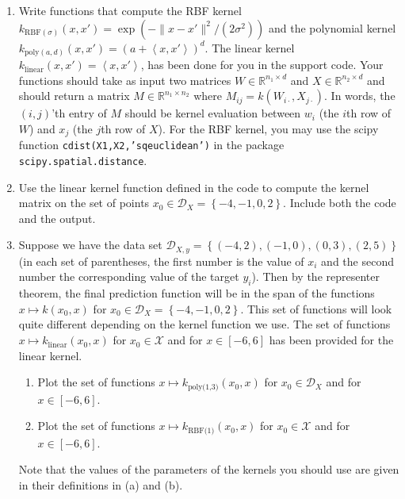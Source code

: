 \documentclass{article}
\theoremstyle{plain}
\theoremstyle{definition}
\begin{document}
\begin{enumerate}
  \setcounter{enumi}{\value{saveenum}}
\item Write functions that compute the RBF kernel $k_{\text{RBF}(\sigma)}(x,x')=\exp\left(-\|x-x'\|^{2}/\left(2\sigma^{2}\right)\right)$
and the polynomial kernel $k_{\text{poly}(a,d)}(x,x')=\left(a+\left\langle x,x'\right\rangle \right)^{d}$.
The linear kernel $k_{\text{linear}}(x,x')=\left\langle x,x'\right\rangle $,
has been done for you in the support code. Your functions should take
as input two matrices $W\in\mathbb{R}^{n_{1}\times d}$ and $X\in\mathbb{R}^{n_{2}\times d}$
and should return a matrix $M\in\mathbb{R}^{n_{1}\times n_{2}}$ where
$M_{ij}=k(W_{i\cdot},X_{j\cdot})$. In words, the $(i,j)$'th entry
of $M$ should be kernel evaluation between $w_{i}$ (the $i$th row
of $W$) and $x_{j}$ (the $j$th row of $X$).
For the RBF kernel, you may use the scipy function \texttt{cdist(X1,X2,'sqeuclidean')}
in the package \texttt{scipy.spatial.distance}. 
\item Use the linear kernel function defined in the code to compute the
kernel matrix on the set of points $x_{0}\in\mathcal{D}_{X}=\left\{ -4,-1,0,2\right\} $.
Include both the code and the output. 
\item Suppose we have the data set $\mathcal{D}_{X,y}= \left\{ (-4,2),(-1,0),(0,3),(2,5)\right\} $ (in each set of parentheses, the first number is the value of $x_i$ and the second number the corresponding value of the target $y_i$).
Then by the representer theorem, the final prediction function will
be in the span of the functions $x\mapsto k(x_{0},x)$ for $x_{0}\in\mathcal{D}_{X}=\left\{ -4,-1,0,2\right\} $.
This set of functions will look quite different depending on the kernel
function we use. The set of functions $x\mapsto k_{\text{linear}}(x_{0},x)$ for
$x_{0}\in\mathcal{X}$ and for $x\in[-6,6]$ has been provided for the linear kernel.
\begin{enumerate}
\item Plot the set of functions $x\mapsto k_{\text{poly(1,3)}}(x_{0},x)$
for $x_{0}\in\mathcal{D}_{X}$ and for $x\in[-6,6]$.
\item Plot the set of functions $x\mapsto k_{\text{RBF(1)}}(x_{0},x)$ for
$x_{0}\in\mathcal{X}$ and for $x\in[-6,6]$.
\end{enumerate}
Note that the values of the parameters of the kernels you should use are given in their definitions in (a) and (b).


\end{enumerate}
\end{document}
